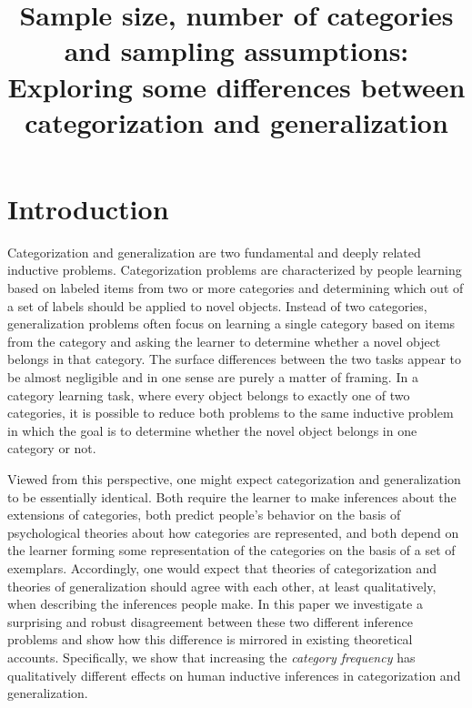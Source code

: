 \documentclass[doc,apacite]{apa6}
\title{Sample size, number of categories and sampling assumptions: Exploring some differences between categorization and generalization}
\begin{document}
\ifpdf
{}
\else
{}
\fi

\maketitle

\section{Introduction}

Categorization and generalization are two fundamental and deeply related inductive problems. Categorization problems are characterized by people learning based on labeled items from two or more categories and determining which out of a set of labels should be applied to novel objects. Instead of two categories, generalization problems often focus on learning a single category based on items from the category and asking the learner to determine whether a novel object belongs in that category. The surface differences between the two tasks appear to be almost negligible and in one sense are purely a matter of framing. 
In a category learning task, where every object belongs to exactly one of two categories, it is possible to reduce both problems to the same inductive problem in which the goal is to determine whether the novel object belongs in one category or not. 

Viewed from this perspective, one might expect categorization and generalization to be essentially identical. Both require the learner to make inferences about the extensions of categories, both predict people's behavior on the basis of psychological theories about how categories are represented, and both depend on the learner forming some representation of the categories on the basis of a set of exemplars. Accordingly, one would expect that theories of categorization and theories of generalization should agree with each other, at least qualitatively, when describing the inferences people make. In this paper we investigate a surprising and robust disagreement between these two different inference problems and show how this difference is mirrored in existing theoretical accounts. Specifically, we show that increasing the {\it category frequency} has qualitatively different effects on human inductive inferences in categorization and generalization.  
\end{document}
